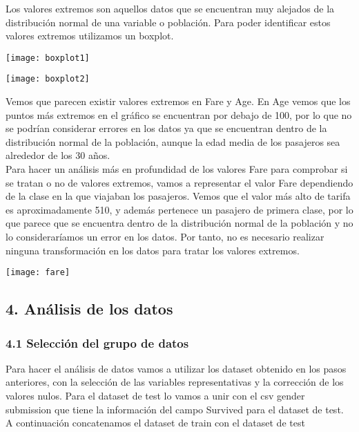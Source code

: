 \documentclass[12pt]{article}
\begin{document}
Los valores extremos son aquellos datos que se encuentran muy alejados de la distribución normal de una variable o población. Para poder identificar estos valores extremos utilizamos un boxplot.

\label{imagen}
  	\begin{center}
  	\texttt{[image: boxplot1]}
\end{center}

\label{imagen}
  	\begin{center}
  	\texttt{[image: boxplot2]}
\end{center}

Vemos que parecen existir valores extremos en Fare y Age. En Age vemos que los puntos más extremos en el gráfico se encuentran por debajo de 100, por lo que no se podrían considerar errores en los datos ya que se encuentran dentro de la distribución normal de la población, aunque la edad media de los pasajeros sea alrededor de los 30 años.\\
Para hacer un análisis más en profundidad de los valores Fare para comprobar si se tratan o no de valores extremos, vamos a representar el valor Fare dependiendo de la clase en la que viajaban los pasajeros.
Vemos que el valor más alto de tarifa es aproximadamente 510, y además pertenece un pasajero de primera clase, por lo que parece que se encuentra dentro de la distribución normal de la población y no lo consideraríamos un error en los datos.
Por tanto, no es necesario realizar ninguna transformación en los datos para tratar los valores extremos.

\label{imagen}
  	\begin{center}
  	\texttt{[image: fare]}
\end{center}

\hypertarget{analisis}{%
\subsection{4. Análisis de los datos}\label{analisis}}

\hypertarget{seleccion}{%
\subsubsection{4.1 Selección del grupo de datos}\label{seleccion}}

Para hacer el análisis de datos vamos a utilizar los dataset obtenido en los pasos anteriores, con la selección de las variables representativas y la corrección de los valores nulos. Para el dataset de test lo vamos a unir con el csv gender submission que tiene la información del campo Survived para el dataset de test. A continuación concatenamos el dataset de train con el dataset de test
\end{document}
